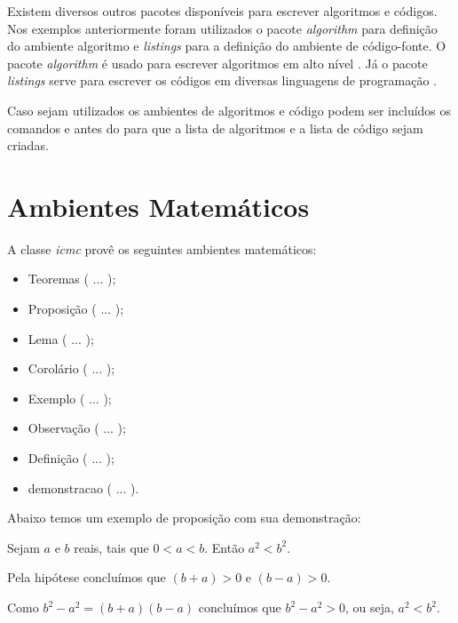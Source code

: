 Existem diversos outros pacotes disponíveis para escrever algoritmos e códigos. Nos exemplos anteriormente foram utilizados o pacote \textit{algorithm} para definição do ambiente algoritmo e \textit{listings} para a definição do ambiente de código-fonte. O pacote \textit{algorithm} é usado para escrever algoritmos em alto nível \cite{janos:2005:algpseudocode}. Já o pacote \textit{listings} serve para escrever os códigos em diversas linguagens de programação \cite{moses:2006:listings}.

Caso sejam utilizados os ambientes de algoritmos e código podem ser incluídos os comandos  e  antes do  para que a lista de algoritmos e a lista de código sejam criadas.


\section{Ambientes Matemáticos}

A classe \textit{icmc} provê os seguintes ambientes matemáticos:
\begin{itemize}
 \item Teoremas ( ... );
 \item Proposição ( ... );
 \item Lema ( ... );
 \item Corolário ( ... );
 \item Exemplo ( ... );
 \item Observação ( ... );
 \item Definição ( ... );
 \item demonstracao ( ... ).
\end{itemize}

Abaixo temos um exemplo de proposição com sua demonstração:
\begin{proposicao}
 Sejam $a$ e $b$ reais, tais que $0<a<b$. Então $a^2<b^2$.
\end{proposicao}
\begin{demonstracao}
 Pela hipótese concluímos que $(b+a)>0$ e $(b-a)>0$.

Como $b^2-a^2=(b+a)(b-a)$ concluímos que $b^2-a^2>0$, ou seja, $a^2<b^2$.
\end{demonstracao}

